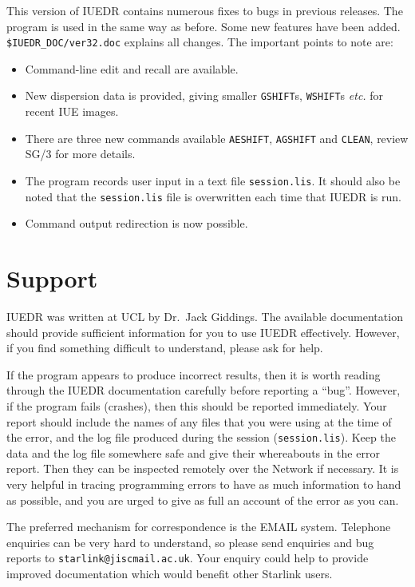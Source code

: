 This version of IUEDR contains numerous fixes to bugs in previous releases.
The program is used in the same way as before.
Some new features have been added.
\verb+$IUEDR_DOC/ver32.doc+ explains all changes.
The important points to note are:

\begin {itemize}

\item Command-line edit and recall are available.
\item New dispersion data is provided, giving smaller \verb+GSHIFT+s,
      \verb+WSHIFT+s {\it etc.}
      for recent IUE images.
\item There are three new commands available {\tt AESHIFT}, {\tt AGSHIFT} and
      {\tt CLEAN}, review SG/3 for more details.
\item The program records user input in a text file {\tt session.lis}.
      It should also be noted that the {\tt session.lis} file is overwritten
      each time that IUEDR is run.
\item Command output redirection is now possible.

\end {itemize}


\section {\label{se:support}Support}

IUEDR was written at UCL by Dr.~Jack Giddings. The available
documentation should provide sufficient information for you to use
IUEDR effectively. However, if you find something difficult to
understand,  please ask for help.

If the program appears to produce incorrect results, then it is worth
reading  through the IUEDR documentation carefully before reporting a
``bug''. However, if the program fails (crashes), then this should be
reported immediately. Your report should include the names of any
files that you were using at the time of the error, and the log file
produced during the session ({\tt session.lis}). Keep the  data and
the log file  somewhere safe and give their whereabouts in the error
report. Then they can be inspected remotely over the Network if
necessary. It is very helpful in tracing programming errors to have as
much information to hand as possible, and you are urged to give as
full an account of the error as you can.

The preferred mechanism for correspondence is the EMAIL system.
Telephone enquiries can be very hard to understand, so please send
enquiries and bug reports to {\tt starlink@jiscmail.ac.uk}. Your enquiry
could help to provide improved documentation which would benefit other
Starlink users.



